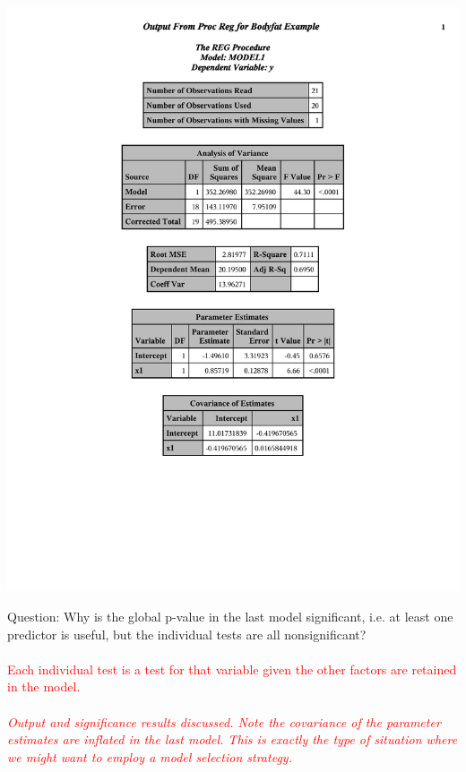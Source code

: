 \documentclass{article}
\begin{document}
\begin{center}
\begin{tabular}{cc}
\end{tabular}
\includegraphics[page=5,scale=0.6,trim=40mm 30mm 20mm 10mm]{bodyfatexample}
\end{center}

Question:  Why is the global p-value in the last model significant, i.e. at least one predictor is useful, but the individual tests are all nonsignificant?\\~\\

\textcolor{red}{Each individual test is a test for that variable given the other factors are retained in the model.}\\~\\

\textit{\textcolor{red}{Output and significance results discussed.  Note the covariance of the parameter estimates are inflated in the last model.  This is exactly the type of situation where we might want to employ a model selection strategy.}}\\~\\
\end{document}
